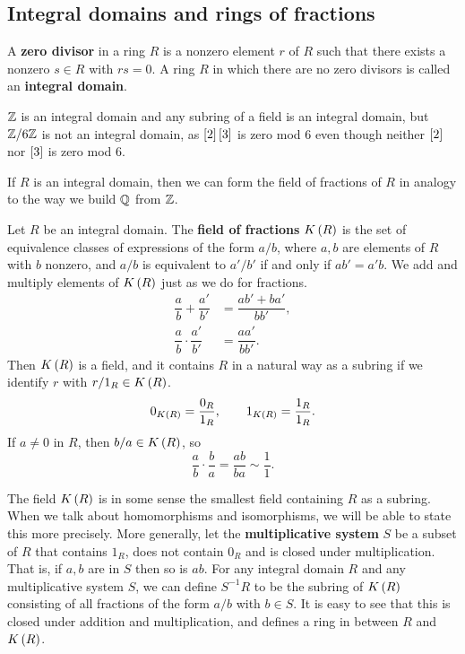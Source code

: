\pagebreak

\subsection{Integral domains and rings of fractions}


\begin{definition}
A \textbf{zero divisor} in a ring $ R $ is a nonzero element $ r $ of $ R $ such that there exists a nonzero $ s \in R $ with $ rs = 0 $. A ring $ R $ in which there are no zero divisors is called an \textbf{integral domain}.
\end{definition}

\begin{example*}
$ \mathbb{Z} $ is an integral domain and any subring of a field is an integral domain, but $ \mathbb{Z} / 6\mathbb{Z} $ is not an integral domain, as $ \sbr{2}\sbr{3} $ is zero mod $ 6 $ even though neither $ \sbr{2} $ nor $ \sbr{3} $ is zero mod $ 6 $.
\end{example*}

If $ R $ is an integral domain, then we can form the field of fractions of $ R $ in analogy to the way we build $ \mathbb{Q} $ from $ \mathbb{Z} $.

\begin{definition}
Let $ R $ be an integral domain. The \textbf{field of fractions} $ K\br{R} $ is the set of equivalence classes of expressions of the form $ a / b $, where $ a, b $ are elements of $ R $ with $ b $ nonzero, and $ a / b $ is equivalent to $ a' / b' $ if and only if $ ab' = a'b $. We add and multiply elements of $ K\br{R} $ just as we do for fractions.
\begin{align*}
\dfrac{a}{b} + \dfrac{a'}{b'} & = \dfrac{ab' + ba'}{bb'}, \\
\dfrac{a}{b} \cdot \dfrac{a'}{b'} & = \dfrac{aa'}{bb'}.
\end{align*}
Then $ K\br{R} $ is a field, and it contains $ R $ in a natural way as a subring if we identify $ r $ with $ r / 1_R \in K\br{R} $.
$$ 0_{K\br{R}} = \dfrac{0_R}{1_R}, \qquad 1_{K\br{R}} = \dfrac{1_R}{1_R}. $$
If $ a \ne 0 $ in $ R $, then $ b / a \in K\br{R} $, so
$$ \dfrac{a}{b} \cdot \dfrac{b}{a} = \dfrac{ab}{ba} \sim \dfrac{1}{1}. $$
\end{definition}

The field $ K\br{R} $ is in some sense the smallest field containing $ R $ as a subring. When we talk about homomorphisms and isomorphisms, we will be able to state this more precisely. More generally, let the \textbf{multiplicative system} $ S $ be a subset of $ R $ that contains $ 1_R $, does not contain $ 0_R $ and is closed under multiplication. That is, if $ a, b $ are in $ S $ then so is $ ab $. For any integral domain $ R $ and any multiplicative system $ S $, we can define $ S^{-1}R $ to be the subring of $ K\br{R} $ consisting of all fractions of the form $ a / b $ with $ b \in S $. It is easy to see that this is closed under addition and multiplication, and defines a ring in between $ R $ and $ K\br{R} $.

